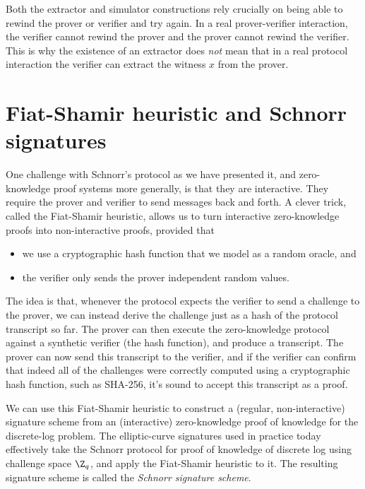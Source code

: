 Both the extractor and simulator constructions rely crucially on being
able to rewind the prover or verifier and try again. 
In a real prover-verifier interaction, the verifier cannot rewind the prover
and the prover cannot rewind the verifier.
This is why the existence of an extractor does \emph{not} mean that
in a real protocol interaction the verifier can extract the witness
$x$ from the prover.


\section{Fiat-Shamir heuristic and Schnorr signatures}
\label{sec:hvzk}

One challenge with Schnorr's protocol as we have presented it,
and zero-knowledge proof systems more generally,
is that they are interactive.
They require the prover and verifier to send messages back and forth.
A clever trick, called the Fiat-Shamir heuristic, allows us to turn interactive
zero-knowledge proofs into non-interactive proofs, provided that
\begin{itemize}
  \item we use a cryptographic hash function that we model as a random oracle, and
  \item the verifier only sends the prover independent random values.
\end{itemize}
The idea is that, whenever the protocol expects the verifier to send a challenge to the
prover, we can instead derive the challenge just as a hash of the protocol transcript so far.
The prover can then execute the zero-knowledge
protocol against a synthetic verifier (the hash function), and produce
a transcript.  The prover can now send this transcript to the verifier,
and if the verifier can confirm that indeed all of the challenges were
correctly computed using a cryptographic hash function, such as 
SHA-256, it's sound to accept this transcript as a proof.

We can use this Fiat-Shamir heuristic to construct a (regular,
non-interactive) signature scheme from an (interactive) zero-knowledge
proof of knowledge for the discrete-log problem.
The elliptic-curve signatures used in practice today
effectively take the Schnorr protocol for proof of knowledge of discrete log
using challenge space $\Z_q$, and apply the Fiat-Shamir heuristic to it.
The resulting signature scheme is called the \emph{Schnorr signature scheme}.
